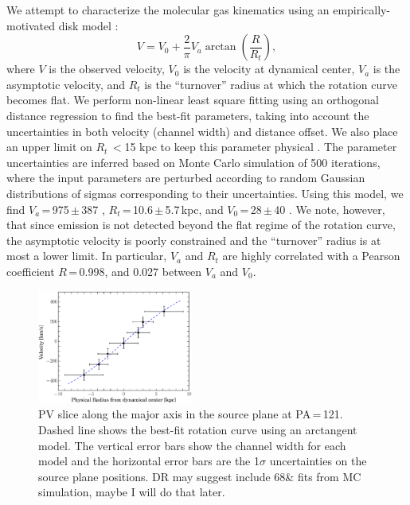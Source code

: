 \documentclass[]{emulateapj}
\begin{document}
We attempt to characterize the molecular gas kinematics using an
empirically-motivated disk model \citep[\eg][]{Courteau97a,Puech08a,Miller11a}:
\begin{equation}
V = V_0 + \frac{2}{\pi} V_{a} \arctan(\frac{R}{R_{t}}),
\end{equation}
where $V$ is the observed velocity, $V_0$ is the velocity at dynamical center,
$V_{a}$ is the asymptotic velocity, and $R_{t}$ is the ``turnover''
radius at which the rotation curve becomes flat.
We perform non-linear least square fitting using an orthogonal distance
regression to find the best-fit parameters,
taking into account the uncertainties in both velocity (channel width) and
distance offset. We also place an upper limit on $R_{t}$\,$<$15 kpc
to keep this parameter physical \citep[\eg][]{Puech08a,Miller11a}.
The parameter uncertainties are inferred based on Monte Carlo simulation
of 500 iterations, where the input parameters are perturbed
according to random Gaussian distributions of sigmas
corresponding to their uncertainties.
Using this model, we find $V_{a}$\,=\,975\,$\pm$\,387 \kms,
$R_{t}$\,=\,10.6\,$\pm$\,5.7\,kpc, and $V_0$\,=\,28\,$\pm$\,40 \kms.
We note, however, that since emission is not detected beyond the flat regime
of the rotation curve, the asymptotic velocity is poorly constrained and
the ``turnover'' radius is at most a lower limit.
In particular, $V_{a}$ and $R_{t}$ are highly correlated with a
Pearson coefficient $R$\,=\,0.998, and 0.027 between $V_{a}$ and $V_0$.

\begin{figure}[!htbp]
\centering
\includegraphics[width=0.455\textwidth]{../Figures/bestfit_PV.eps}
\caption{PV slice along the major axis in the source plane at PA\,=\,121\degr.
Dashed line shows the best-fit rotation curve using an arctangent model.
The vertical error bars show the channel width for
each model and the horizontal error bars are the
1$\sigma$ uncertainties on the source plane positions.
DR may suggest include 68\& fits from MC simulation, maybe I will do that later.
 \label{fig:PV}}
\end{figure}
\end{document}
